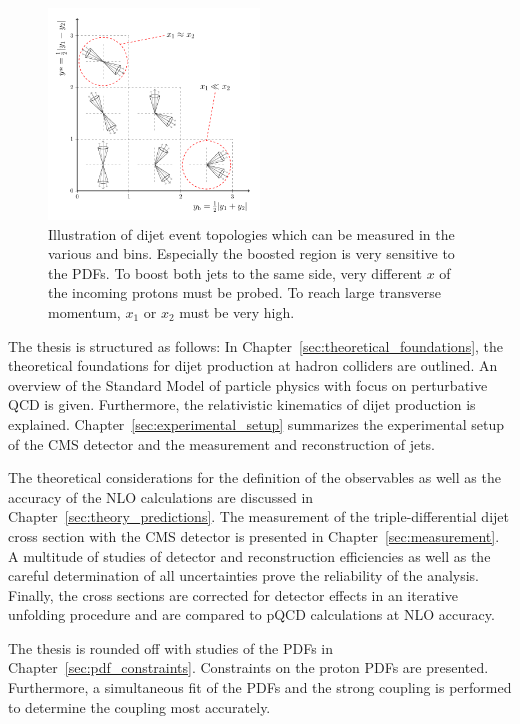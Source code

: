 \begin{figure}
    \centering
    \caption[Illustration of dijet topologies various \ystar and \yboost bins]{
             Illustration of dijet event topologies which can be measured in
             the various \ystar and \yboost bins. Especially the boosted region
             is very sensitive to the PDFs. To boost both jets to the same side,
             very different $x$ of the incoming protons must be probed. To reach
             large transverse momentum, $x_1$ or $x_2$ must be very high.}
    \label{fig:intro_ybys_hint}
    \includegraphics[width=0.5\textwidth]{figures/drawings/ybys_hint.pdf}
\end{figure}

The thesis is structured as follows: In
Chapter~\ref{sec:theoretical_foundations}, the theoretical foundations for dijet
production at hadron colliders are outlined. An overview of the Standard Model
of particle physics with focus on perturbative QCD is given.  Furthermore, the
relativistic kinematics of dijet production is explained.
Chapter~\ref{sec:experimental_setup} summarizes the experimental setup of the
CMS detector and the measurement and reconstruction of jets. 

The theoretical considerations for the definition of the observables as well as
the accuracy of the NLO calculations are discussed in
Chapter~\ref{sec:theory_predictions}. The measurement of the triple-differential
dijet cross section with the CMS detector is presented in
Chapter~\ref{sec:measurement}. A multitude of studies of detector and
reconstruction efficiencies as well as the careful determination of all
uncertainties prove the reliability of the analysis.  Finally, the cross
sections are corrected for detector effects in an iterative unfolding procedure
and are compared to pQCD calculations at NLO accuracy.

The thesis is rounded off with studies of the PDFs in
Chapter~\ref{sec:pdf_constraints}. Constraints on the proton PDFs are presented.
Furthermore, a simultaneous fit of the PDFs and the strong coupling is performed
to determine the coupling most accurately.

